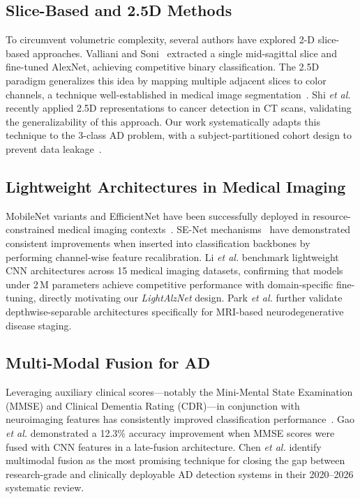 \documentclass[conference]{IEEEtran}
\newcommand{\etal}{\textit{et al.}\xspace}
\newcommand{\modelname}{\textit{LightAlzNet}\xspace}
\begin{document}
\subsection{Slice-Based and 2.5D Methods}
To circumvent volumetric complexity, several authors have
explored 2-D slice-based approaches. Valliani and
Soni~\cite{valliani2017} extracted a single mid-sagittal slice
and fine-tuned AlexNet, achieving competitive binary
classification. The 2.5D paradigm generalizes this idea by
mapping multiple adjacent slices to color channels, a technique
well-established in medical image segmentation~\cite{roth2016}.
Shi \etal \cite{shi2025} recently applied 2.5D representations
to cancer detection in CT scans, validating the generalizability
of this approach. Our work systematically adapts this technique
to the 3-class AD problem, with a subject-partitioned cohort
design to prevent data leakage~\cite{arbabshirani2017}.

\subsection{Lightweight Architectures in Medical Imaging}
MobileNet variants and EfficientNet have been successfully
deployed in resource-constrained medical imaging
contexts~\cite{rajpurkar2017,gulshan2016}. SE-Net
mechanisms~\cite{hu2018} have demonstrated consistent
improvements when inserted into classification backbones by
performing channel-wise feature recalibration. Li \etal
\cite{li2025bench} benchmark lightweight CNN architectures
across 15 medical imaging datasets, confirming that models
under 2\,M parameters achieve competitive performance with
domain-specific fine-tuning, directly motivating our \modelname
design. Park \etal \cite{park2026} further validate
depthwise-separable architectures specifically for MRI-based
neurodegenerative disease staging.

\subsection{Multi-Modal Fusion for AD}
Leveraging auxiliary clinical scores---notably the Mini-Mental
State Examination (MMSE) and Clinical Dementia Rating
(CDR)---in conjunction with neuroimaging features has
consistently improved classification
performance~\cite{zhang2022}. Gao \etal \cite{gao2024}
demonstrated a 12.3\% accuracy improvement when MMSE scores
were fused with CNN features in a late-fusion architecture.
Chen \etal \cite{chen2026} identify multimodal fusion as the
most promising technique for closing the gap between
research-grade and clinically deployable AD detection systems
in their 2020--2026 systematic review.
\end{document}
